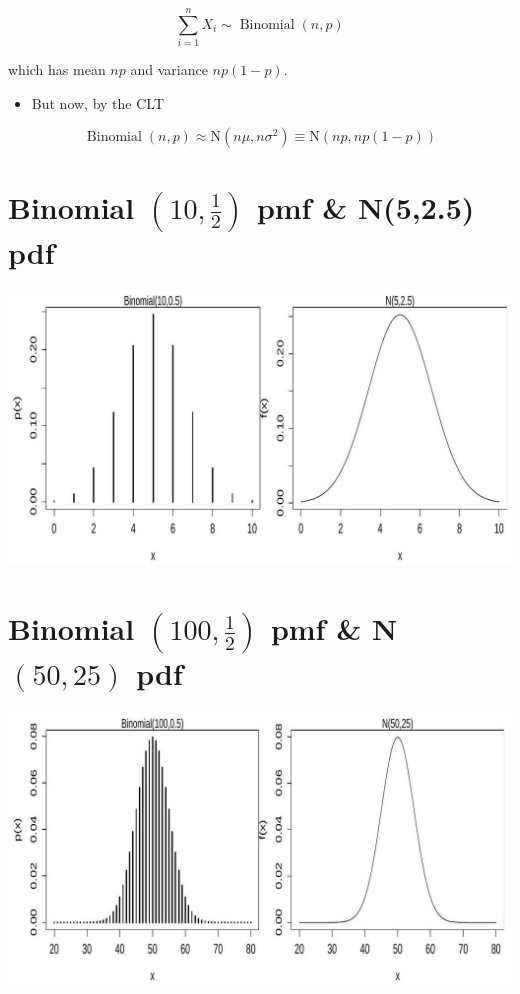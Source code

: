 \documentclass[10pt]{article}
\begin{document}
$$
\sum_{i=1}^{n} X_{i} \sim \operatorname{Binomial}(n, p)
$$

which has mean $n p$ and variance $n p(1-p)$.

\begin{itemize}
  \item But now, by the CLT
\end{itemize}

$$
\operatorname{Binomial}(n, p) \approx \mathrm{N}\left(n \mu, n \sigma^{2}\right) \equiv \mathrm{N}(n p, n p(1-p))
$$

\section*{Binomial $\left(10, \frac{1}{2}\right)$ pmf \& N(5,2.5) pdf}
\begin{center}
\includegraphics[max width=\textwidth]{2025_05_12_2c033a5f0417cd8b136fg-32}
\end{center}

\section*{Binomial $\left(100, \frac{1}{2}\right)$ pmf \& N $(50,25)$ pdf}
\begin{center}
\includegraphics[max width=\textwidth]{2025_05_12_2c033a5f0417cd8b136fg-33}
\end{center}
\end{document}
